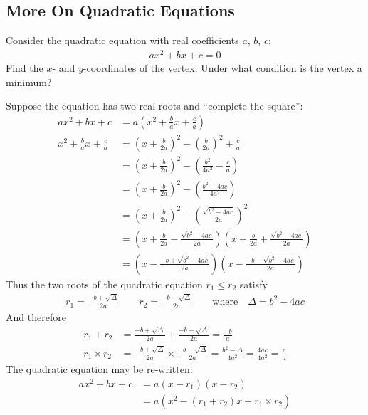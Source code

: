 \documentclass[12pt]{article}
\begin{document}
\subsection*{More On Quadratic Equations}
Consider the quadratic equation with real coefficients $a$, $b$, $c$:
\begin{align*}
a x^2 + b x + c = 0
\end{align*}
Find the $x$- and $y$-coordinates of the vertex. Under what condition is the vertex a minimum? 

\begin{answer}
Suppose the equation has two real roots and ``complete the square'':
\begin{align*}
a x^2 + b x + c 
  & = a \left(x^2 + \frac{b}{a} x + \frac{c}{a} \right) \\
x^2 + \frac{b}{a} x + \frac{c}{a}
  & = \left(x + \frac{b}{2a}\right)^2 - \left(\frac{b}{2a}\right)^2 + \frac{c}{a} \\
  & = \left(x+\frac{b}{2a}\right)^2 
    - \left(\frac{b^2}{4a^2} - \frac{c}{a} \right) \\
  & = \left(x+\frac{b}{2a}\right)^2 
    - \left(\frac{b^2-4ac}{4a^2} \right) \\
  & = \left(x+\frac{b}{2a}\right)^2 
    - \left(\frac{\sqrt{b^2-4ac}}{2a}\right)^2 \\    
  & = \left(x+\frac{b}{2a}-\frac{\sqrt{b^2-4ac}}{2a}\right) 
      \left(x+\frac{b}{2a}+\frac{\sqrt{b^2-4ac}}{2a}\right) \\
  & = \left(x-\frac{-b+\sqrt{b^2-4ac}}{2a}\right) 
      \left(x-\frac{-b-\sqrt{b^2-4ac}}{2a}\right)
\end{align*}
Thus the two roots of the quadratic equation $r_1\leq r_2$ satisfy
\begin{align*}
r_1 = \frac{-b+\sqrt{\Delta}}{2a}
  \qquad
r_2 = \frac{-b-\sqrt{\Delta}}{2a} 
  \qquad\text{where}\quad \Delta = b^2-4ac
\end{align*}
And therefore
\begin{align*}
r_1 + r_2 
  & = \frac{-b+\sqrt{\Delta}}{2a} + \frac{-b-\sqrt{\Delta}}{2a} 
    = \frac{-b}{a} \\
r_1 \times r_2 
  & = \frac{-b+\sqrt{\Delta}}{2a} \times \frac{-b-\sqrt{\Delta}}{2a}
    = \frac{b^2-\Delta}{4a^2} 
    = \frac{4ac}{4a^2}
    = \frac{c}{a}
\end{align*}
The quadratic equation may be re-written:
\begin{align*}
a x^2 + b x + c 
  & = a (x-r_1)(x-r_2) \\
  & = a \left(x^2 - \left(r_1+r_2\right) x + r_1 \times r_2 \right)

\end{align*}
\end{answer}
\end{document}
